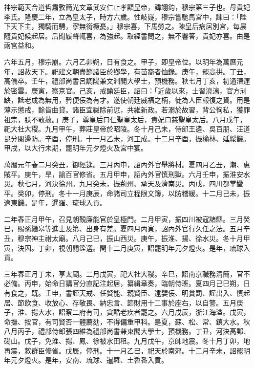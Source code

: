 
\begin{pinyinscope}
神宗範天合道哲肅敦簡光文章武安仁止孝顯皇帝，諱翊鈞，穆宗第三子也。母貴妃李氏。隆慶二年，立為皇太子，時方六歲。性岐嶷，穆宗嘗馳馬宮中，諫曰：「陛下天下主，獨騎而騁，寧無銜橛憂。」穆宗喜，下馬勞之。陳皇后病居別宮，每晨隨貴妃候起居。后聞履聲輒喜，為強起。取經書問之，無不響答，貴妃亦喜。由是兩宮益和。

六年五月，穆宗崩。六月乙卯朔，日有食之。甲子，即皇帝位。以明年為萬曆元年，詔赦天下。祀建文朝盡節諸臣於鄉學，有苗裔者恤錄。庚午，罷高拱。丁丑，高儀卒。壬午，禮部尚書呂調陽兼文淵閣大學士，預機務。秋七月丁亥，初通漕運於密雲。庚寅，察京官。己亥，戒諭廷臣，詔曰：「近歲以來，士習澆漓，官方刓缺，詆老成為無用，矜便佞為有才。遂使朝廷威福之柄，徒為人臣報復之資。用是薄示懲戒，餘皆曲貸。諸臣宜祓除前愆，共維新政。若溺於故習，背公徇私，獲罪祖宗，朕不敢赦。」庚子，尊皇后曰仁聖皇太后，貴妃曰慈聖皇太后。八月戊午，祀大社大稷。九月甲午，葬莊皇帝於昭陵。冬十月己未，侍郎王遴、吳百朋、汪道昆分閱邊防。辛酉，停刑。十一月乙未，河工成。十二月辛酉，振榆林、延綏饑。甲戌，以大行未期，罷明年元夕燈火及宮中宴。

萬曆元年春二月癸丑，御經筵。三月丙申，詔內外官舉將材。夏四月乙丑，潮、惠賊平。庚午，旱，諭百官修省。五月甲申，詔內外官慎刑獄。六月壬申，振淮安水災。秋七月，河決徐州。九月癸未，振荊州、承天及濟南災。丙戌，四川都掌蠻平。癸卯，停刑。冬十一月庚辰，命諸司立程限文簿，以防稽緩。十二月己未，振遼東饑。是年，暹羅、琉球入貢。

二年春正月甲午，召見朝覲廉能官於皇極門。二月甲寅，振四川被寇諸縣。三月癸巳，賜孫繼皋等進士及第、出身有差。夏四月丙寅，詔內外官行久任之法。五月辛丑，穆宗神主祔太廟。八月己巳，振山西災。庚午，振淮、揚、徐水災。冬十月甲寅，決囚。丁卯，視朝閱銓選。閏十二月庚寅，詔罷明年元夕燈火。是年，琉球入貢。

三年春正月丁未，享太廟。二月戊寅，祀大社大稷。辛巳，詔南京職務清簡，官不必備。丙申，始命日講官分直記注起居，纂緝章奏，臨朝侍班。夏四月己巳朔，日有食之，既。壬申，書謹天戒、任賢能、親賢臣、遠嬖佞、明賞罰、謹出入、慎起居、節飲食、收放心、存敬畏、納忠言、節財用十二事於座右，以自警。五月庚子，淮、揚大水，詔察二府有司，貪酷老疾者罷之。六月戊辰，浙江海溢。戊寅，命撫、按官，有司賢否一體薦劾，不得偏重甲科。是夏，蘇、松、常、鎮大水。秋八月丙子，禮部侍郎張四維為禮部尚書兼東閣大學士，預機務。丁丑，河決高郵、碭山。戊子，免淮、揚、鳳、徐被水田租。九月戊午，京師地震。冬十月丁卯，地再震，敕群臣修省。戊辰，停刑。十一月乙巳，祀天於南郊。十二月辛未，詔罷明年元夕燈火。是年，安南、琉球、暹羅、土魯番入貢。


\end{pinyinscope}
